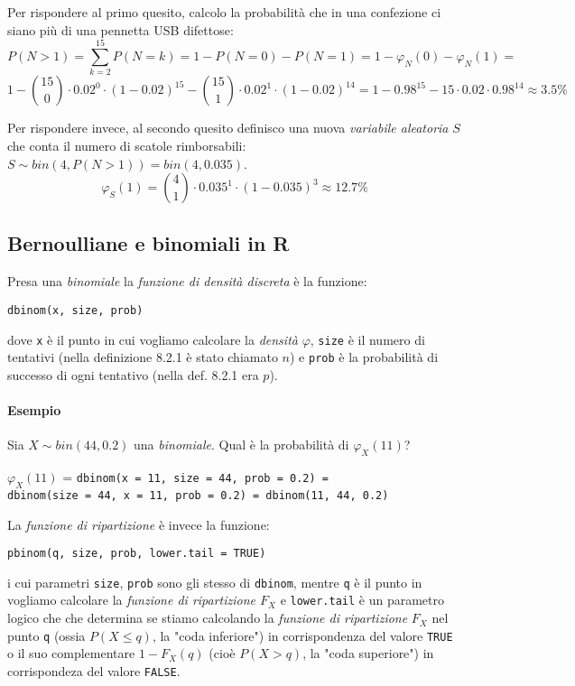 \documentclass[12pt, a4paper]{report}
\theoremstyle{definition}
\begin{document}
Per rispondere al primo quesito, calcolo la probabilità che in una confezione ci
siano più di una pennetta USB difettose:
\[P(N>1)=\sum_{k=2}^{15}P(N=k)=1-P(N=0)-P(N=1)=1-\varphi_N(0)-\varphi_N(1)=\]
\[1-\binom{15}{0}\cdot 0.02^0\cdot (1-0.02)^{15}-\binom{15}{1}\cdot 0.02^1\cdot (1-0.02)^{14}=
1-0.98^{15}-15\cdot 0.02\cdot 0.98^{14}\approx 3.5\%\]

Per rispondere invece, al secondo quesito definisco una nuova \emph{variabile
aleatoria} $S$ che conta il numero di scatole rimborsabili: \(S\sim bin(4,P(N>1)
)=bin(4,0.035)\).
\[\varphi_S(1)=\binom{4}{1}\cdot 0.035^1\cdot (1-0.035)^3\approx 12.7\%\]

\subsection{Bernoulliane e binomiali in R}
Presa una \emph{binomiale} la \emph{funzione di densità discreta} è la funzione:
\begin{center}
	\texttt{dbinom(x, size, prob)}
\end{center}
dove \texttt{x} è il punto in cui vogliamo calcolare la \emph{densità} $\varphi$,
\texttt{size} è il numero di tentativi (nella definizione 8.2.1 è stato chiamato
$n$) e \texttt{prob} è la probabilità di successo di ogni tentativo (nella def. 
8.2.1 era $p$).

\paragraph*{Esempio}
Sia $X\sim bin(44, 0.2)$ una \emph{binomiale}. Qual è la probabilità di
$\varphi_X(11)$?
\begin{center}
	$\varphi_X(11)$ = \texttt{dbinom(x = 11, size = 44, prob = 0.2) =}\\
	\texttt{dbinom(size = 44, x = 11, prob = 0.2) = dbinom(11, 44, 0.2)}
\end{center}

\noindent
La \emph{funzione di ripartizione} è invece la funzione:
\begin{center}
	\texttt{pbinom(q, size, prob, lower.tail = TRUE)}
\end{center}
i cui parametri \texttt{size}, \texttt{prob} sono gli stesso di \texttt{dbinom},
mentre \texttt{q} è il punto in vogliamo calcolare la \emph{funzione di
ripartizione $F_X$} e \texttt{lower.tail} è un parametro logico che che determina
se stiamo calcolando la \emph{funzione di ripartizione} $F_X$ nel punto \texttt{q}
(ossia \(P(X\leq q)\), la "coda inferiore") in corrispondenza del valore 
\texttt{TRUE} o il suo complementare \(1-F_X(q)\) (cioè \(P(X>q)\), la "coda
superiore") in corrispondeza del valore \texttt{FALSE}.
\end{document}
